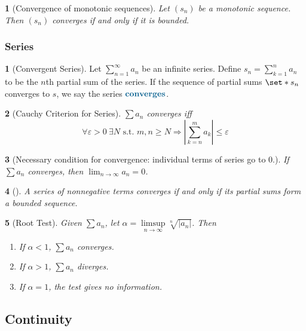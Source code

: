 \documentclass[11pt]{article}
\numberwithin{equation}{section}
\newcommand{\navy}[1]{\textcolor{MidnightBlue}{\bf #1}}
\theoremstyle{plain}
\newtheorem{theorem}{\color{ForestGreen}{\textbf{Theorem}}}[section]
\theoremstyle{definition}
\newtheorem{definition}{\color{MidnightBlue}{\textbf{Definition}}}[section]
\newcommand\abs[1]{\left| #1 \right|}
\def\Set{\set*}%
\def\imp{\Rightarrow}
\newcommand{\1}{\mathbbm 1}
\newcommand{\e}{\varepsilon}
\begin{document}
\begin{theorem}[Convergence of monotonic sequences]
	Let $(s_n)$ be a monotonic sequence. Then $(s_n)$ converges if and only if it is bounded. 
\end{theorem}

\subsubsection{Series}

\begin{definition}[Convergent Series]
	Let $\sum_{n=1}^\infty a_n$ be an infinite series. Define $s_n = \sum_{k=1}^n a_n$ to be the $n$th partial sum of the series. If the sequence of partial sums $\Set{s_n}$ converges to $s$, we say the series $\navy{converges}$.  
\end{definition}

\begin{theorem}[Cauchy Criterion for Series]
	$\sum a_n$ converges iff
	\begin{equation}
		\forall \e > 0 \ \exists N \text{ s.t. } m,n \geq N \imp \abs{\sum_{k=n}^m a_k} \leq \e
	\end{equation}
\end{theorem}

\begin{theorem}[Necessary condition for convergence: individual terms of series go to $0$.]
	If $\sum a_n$ converges, then $\lim_{n \to \infty} a_n = 0$. 
\end{theorem}

\begin{theorem}[]
	A series of nonnegative terms converges if and only if its partial sums form a bounded sequence. 
\end{theorem}

\begin{theorem}[Root Test]
	Given $\sum a_n$, let $\alpha = \limsup\limits_{n \to \infty} \sqrt[n]{\abs{a_n}}$. Then
	\begin{enumerate}
		\item If $\alpha < 1$, $\sum a_n$ converges.
		\item If $\alpha > 1$, $\sum a_n$ diverges.
		\item If $\alpha = 1$, the test gives no information. 
	\end{enumerate}
\end{theorem}




\subsection{Continuity}
\end{document}
